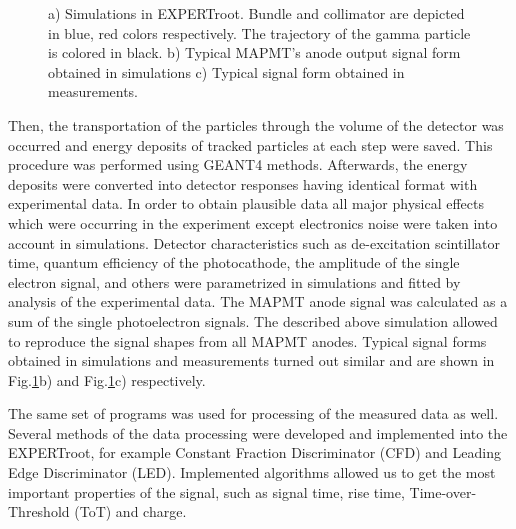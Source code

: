 \documentclass{webofc}
\newcommand{\er}{\textmd{EXPERTroot}}
\begin{document}
\begin{figure}
\begin{minipage}[h]{0.35\linewidth}
		\end{minipage} 
		\caption{a) Simulations in \er. Bundle and collimator are depicted in blue, red colors respectively. The trajectory of the gamma particle is colored in black. b) Typical MAPMT's anode output signal form obtained in simulations c) Typical signal form obtained in measurements.} 
		\label{ris:sim} 
	\end{figure}
Then, the transportation of the particles through the volume of the detector was occurred and energy deposits of tracked particles at each step were saved.
This procedure was performed using GEANT4 \cite{geant4} methods. Afterwards, the energy deposits were converted into detector responses having identical format with experimental data.
In order to obtain plausible data all major physical effects which were occurring in the experiment except electronics noise were taken into account in simulations.
Detector characteristics such as de-excitation scintillator time, quantum efficiency of the photocathode, the amplitude of the single electron signal, and others were parametrized in simulations and fitted by analysis of the experimental data.
The MAPMT anode signal was calculated as a sum of the single photoelectron signals.
The described above simulation allowed  to reproduce the signal shapes from all MAPMT anodes.
Typical signal forms obtained in simulations and measurements turned out similar and are shown in Fig.\ref{ris:sim}b) and Fig.\ref{ris:sim}c) respectively.
	

The same set of programs was used for processing of the measured data as well. Several methods of the data processing were developed and implemented into the \er, for example Constant Fraction Discriminator (CFD) and Leading Edge Discriminator (LED). Implemented algorithms allowed us to get the most important properties of the signal, such as signal time, rise time, Time-over-Threshold (ToT) and charge.

\end{document}
